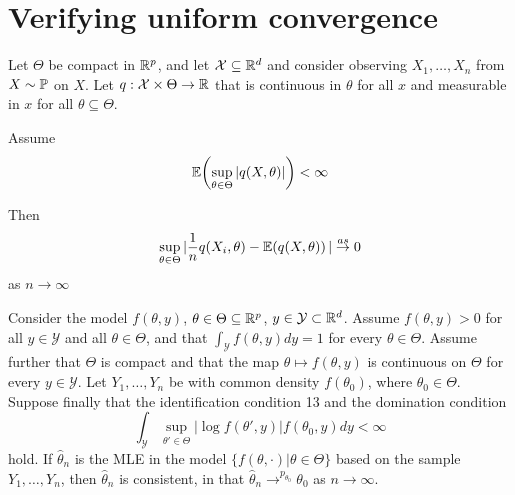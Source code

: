 \section{Verifying uniform convergence}
\label{sec:verify-unif-conv}

\begin{thm}
  Let $\Theta$ be compact in $\mathbb{R}^{p}$, and let $\mathcal{X} \subseteq \mathbb{R}^{d}$
  and consider observing $X_{1}, \dots, X_{n}$ \iid from $X \sim
  \Prob$ on $X$.  Let $q: \mathcal{X} \times \Theta \rightarrow \mathbb{R}$
  that is continuous in $\theta$ for all $x$ and measurable in $x$ for
  all $\theta \subseteq \Theta$.

  Assume
  \begin{equation}
    \label{eq:50}
    \E{\sup_{\theta \in \Theta} | q(X, \theta)|} < \infty
  \end{equation}

  Then
  \begin{equation}
    \label{eq:51}
    \sup_{\theta \in \Theta} | \frac{1}{n} q(X_{i}, \theta) - \E{q(X,
      \theta)} | \cas 0
  \end{equation} as $n \rightarrow \infty$
\end{thm}

\begin{thm}
  Consider the model $f(\theta, y)$, $\theta \in \Theta \subseteq
  \mathbb{R}^{p}$, $y \in \mathcal{Y} \subset \mathbb{R}^{d}$.  Assume $f(\theta, y) >
  0$ for all $y \in \mathcal{Y}$ and all $\theta \in \Theta$, and that
  $\int_{\mathcal{Y}} f(\theta, y) dy = 1$ for every $\theta \in
  \Theta$. Assume further that $\Theta$ is compact and that the map
  $\theta \mapsto f(\theta, y)$ is continuous on $\Theta$ for every $y
  \in \mathcal{Y}$.  Let $Y_{1}, \dots, Y_{n}$ be \iid with common
  density $f(\theta_{0})$, where $\theta_{0} \in \Theta$.  Suppose
  finally that the identification condition 13 and the domination
  condition
  \begin{equation}
    \label{eq:2}
    \int_{\mathcal{Y}} \sup_{\theta' \in \Theta} | \log f(\theta', y)
    | f(\theta_{0}, y) dy < \infty
  \end{equation} hold.  If $\hat \theta_{n}$ is the MLE in the model
  $\{ f(\theta, \cdot) | \theta \in \Theta \} $ based on the sample
  $Y_{1}, \dots, Y_{n}$, then $\hat \theta_{n}$ is consistent, in that
  $\hat \theta_{n} \rightarrow^{p_{\theta_{0}}} \theta_{0}$ as $n
  \rightarrow \infty$.
\end{thm}


